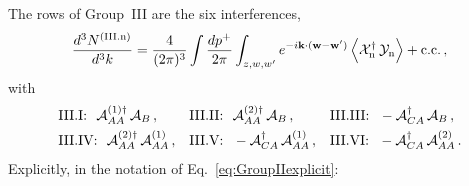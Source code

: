 The rows of Group~III are the six interferences,
\begin{align}\label{eq:GroupIIIrows}
\frac{d^3N^{\rm(III.n)}}{d^3k}=\frac{4}{(2\pi)^3}\int\frac{dp^+}{2\pi}\int_{z,w,w'}e^{-i\mathbf{k}\cdot(\mathbf{w}-\mathbf{w}')}\,\Big\langle\mathcal X^{\dagger}_{\rm n}\,\mathcal Y_{\rm n}\Big\rangle+{\rm c.c.}\,,
\end{align}
with
\begin{align}\label{eq:GroupIIIlist}
&\text{III.I:}\ \ \mathcal A^{(1)\dagger}_{AA}\,\mathcal A_B\,,&&\text{III.II:}\ \ \mathcal A^{(2)\dagger}_{AA}\,\mathcal A_B\,,&&\text{III.III:}\ \ -\mathcal A^{\dagger}_{CA}\,\mathcal A_B\,,\notag\\
&\text{III.IV:}\ \ \mathcal A^{(2)\dagger}_{AA}\,\mathcal A^{(1)}_{AA}\,,&&\text{III.V:}\ \ -\mathcal A^{\dagger}_{CA}\,\mathcal A^{(1)}_{AA}\,,&&\text{III.VI:}\ \ -\mathcal A^{\dagger}_{CA}\,\mathcal A^{(2)}_{AA}\,.
\end{align}
Explicitly, in the notation of Eq.~\eqref{eq:GroupIIexplicit}:

